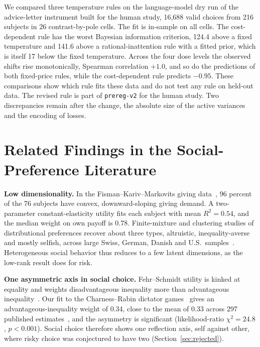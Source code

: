 \documentclass[journal]{IEEEtran}
\begin{document}
We compared three temperature rules on the language-model dry run of the advice-letter instrument built for the human study, 16{,}688 valid choices from 216 subjects in 26 contrast-by-pole cells.
The fit is in-sample on all cells.
The cost-dependent rule has the worst Bayesian information criterion, 124.4 above a fixed temperature and 141.6 above a rational-inattention rule with a fitted prior, which is itself 17 below the fixed temperature.
Across the four dose levels the observed shifts rise monotonically, Spearman correlation $+1.0$, and so do the predictions of both fixed-price rules, while the cost-dependent rule predicts $-0.95$.
These comparisons show which rule fits these data and do not test any rule on held-out data.
The revised rule is part of \texttt{prereg-v2} for the human study.
Two discrepancies remain after the change, the absolute size of the active variances and the encoding of losses.

\section{Related Findings in the Social-Preference Literature}
\label{sec:corroboration}

\textbf{Low dimensionality.}
In the Fisman--Kariv--Markovits giving data~\cite{fisman2007}, 96 percent of the 76 subjects have convex, downward-sloping giving demand.
A two-parameter constant-elasticity utility fits each subject with mean $R^2=0.54$, and the median weight on own payoff is 0.78.
Finite-mixture and clustering studies of distributional preferences recover about three types, altruistic, inequality-averse and mostly selfish, across large Swiss, German, Danish and U.S.\ samples~\cite{bruhin2019,fehrCharness2025}.
Heterogeneous social behavior thus reduces to a few latent dimensions, as the low-rank result does for risk.

\textbf{One asymmetric axis in social choice.}
Fehr--Schmidt utility is kinked at equality and weights disadvantageous inequality more than advantageous inequality~\cite{fehr1999}.
Our fit to the Charness--Rabin dictator games~\cite{charness2002} gives an advantageous-inequality weight of 0.34, close to the mean of 0.33 across 297 published estimates~\cite{nunnariPozzi2022}, and the asymmetry is significant (likelihood-ratio $\chi^2=24.8$, $p<0.001$).
Social choice therefore shows one reflection axis, self against other, where risky choice was conjectured to have two (Section~\ref{sec:rejected}).
\end{document}
